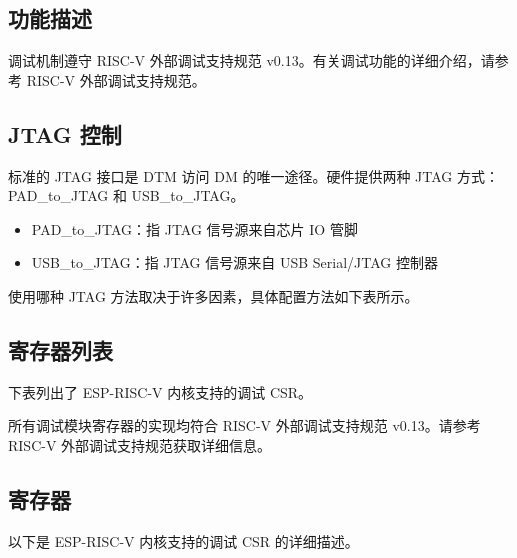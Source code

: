 \documentclass[main\_\_CN.tex]{subfiles}
\begin{document}
\subsection{功能描述}
\label{sec:riscvcpu-dbg-func-descr}

调试机制遵守 RISC-V 外部调试支持规范 v0.13。有关调试功能的详细介绍，请参考 RISC-V 外部调试支持规范。

\subsection{JTAG 控制}
\label{sec:riscvcpu-dbg-jtag-cntl}

标准的 JTAG 接口是 DTM 访问 DM 的唯一途径。硬件提供两种 JTAG 方式：PAD\_to\_JTAG 和 USB\_to\_JTAG。

\begin{itemize}
    \item {PAD\_to\_JTAG：指 JTAG 信号源来自芯片 IO 管脚}
    \item {USB\_to\_JTAG：指 JTAG 信号源来自 USB Serial/JTAG 控制器}
\end{itemize}

使用哪种 JTAG 方法取决于许多因素，具体配置方法如下表所示。




\hypertarget{riscvcpu-dbg-reg-summ}{}
\subsection{寄存器列表}
\label{sec:riscvcpu-dbg-reg-summ}


下表列出了 ESP-RISC-V 内核支持的调试 CSR。


所有调试模块寄存器的实现均符合 RISC-V 外部调试支持规范 v0.13。请参考 RISC-V 外部调试支持规范获取详细信息。



\subsection{寄存器}
以下是 ESP-RISC-V 内核支持的调试 CSR 的详细描述。



\end{document}
